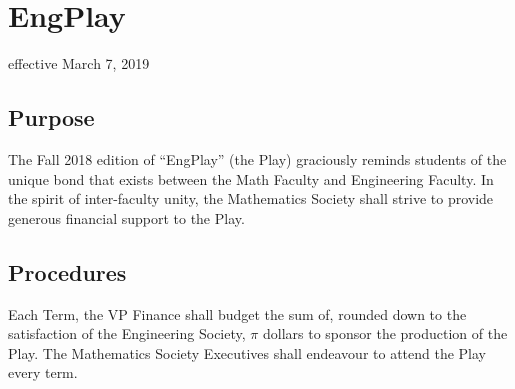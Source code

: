 \section{EngPlay}
effective March 7, 2019

\subsection{Purpose}

The Fall 2018 edition of “EngPlay” (the Play) graciously reminds students of the unique bond that exists between the Math Faculty and Engineering Faculty. In the spirit of inter-faculty unity, the Mathematics Society shall strive to provide generous financial support to the Play.

\subsection{Procedures}

Each Term, the VP Finance shall budget the sum of, rounded down to the satisfaction of the Engineering Society, $\pi$ dollars to sponsor the production of the Play. The Mathematics Society Executives shall endeavour to attend the Play every term.
